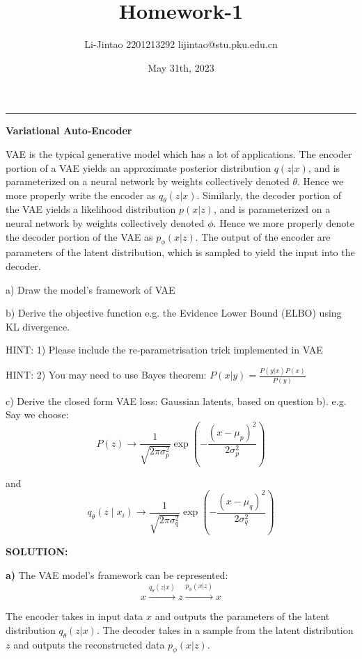 \documentclass{homework}
\author{Li-Jintao 2201213292 lijintao@stu.pku.edu.cn}
\date{May 31th, 2023}
\title{\Large \textbf{Homework-1}}
\begin{document}
 \maketitle
\rule[0ex]{\textwidth}{1.5pt}
\begin{shaded}
\question \textbf{Variational Auto-Encoder}
    
VAE is the typical generative model which has a lot of applications. The encoder portion of a VAE yields an approximate posterior distribution $q(z | x)$, and is parameterized on a neural network by weights collectively denoted $\theta$. Hence we more properly write the encoder as $q_{\theta}(z | x)$. Similarly, the decoder portion of the VAE yields a likelihood distribution $p(x | z)$, and is parameterized on a neural network by weights collectively denoted $\phi$. Hence we more properly denote the decoder portion of the VAE as $p_{\phi}(x | z)$. The output of the encoder are parameters of the latent distribution, which is sampled to yield the input into the decoder.

a) Draw the model's framework of VAE

b) Derive the objective function e.g. the Evidence Lower Bound (ELBO) using KL divergence.

HINT: 1) Please include the re-parametrisation trick implemented in VAE

HINT: 2) You may need to use Bayes theorem: $P(x | y)=\frac{P(y | x) P(x)}{P(y)}$ 

c) Derive the closed form VAE loss: Gaussian latents, based on question b). e.g. Say we choose:
$$
P(z) \rightarrow \frac{1}{\sqrt{2 \pi \sigma_{p}^{2}}} \exp \left(-\frac{\left(x-\mu_{p}\right)^{2}}{2 \sigma_{p}^{2}}\right)
$$

and
$$
q_{\theta}\left(z \mid x_{i}\right) \rightarrow \frac{1}{\sqrt{2 \pi \sigma_{q}^{2}}} \exp \left(-\frac{\left(x-\mu_{q}\right)^{2}}{2 \sigma_{q}^{2}}\right)
$$
    
\end{shaded}
\textbf{SOLUTION:}

\textbf{a)} The VAE model's framework can be represented:
$$
x \overset{q_\theta(z|x)}{\rightarrow} z \overset{p_\phi(x|z)}{\rightarrow} x
$$

The encoder takes in input data $x$ and outputs the parameters of the latent distribution $q_{\theta}(z | x)$. The decoder takes in a sample from the latent distribution $z$ and outputs the reconstructed data $p_{\phi}(x | z)$.

\end{document}
